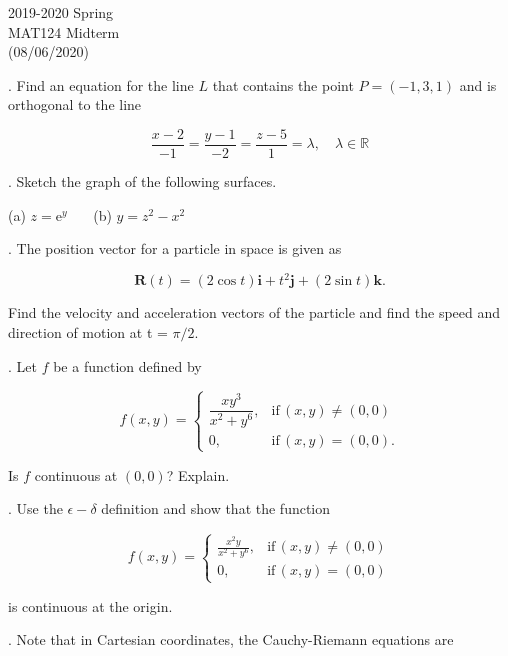 \documentclass{article}
\begin{document}
\pagestyle{empty}
\large

\begin{center}
2019-2020 Spring \\MAT124 Midterm\\(08/06/2020)
\end{center}

. Find an equation for the line $L$ that contains the point $P= (-1,3,1)$ and is orthogonal to the line

\[\frac{x-2}{-1}=\frac{y-1}{-2}=\frac{z-5}{1}=\lambda,\quad\lambda\in\mathbb{R}\]

\hfill

. Sketch the graph of the following surfaces.

\hfill

(a) $z=\mathrm e^y$ \ \ \ (b) $y=z^2-x^2$

\hfill

. The position vector for a particle in space is given as

\[\textbf{R}(t) = (2\cos t)\textbf{i}+t^2\textbf{j}+(2\sin t)\textbf{k}.\]
    
\noindent Find the velocity and acceleration vectors of the particle and find the speed and direction of motion at t = $\pi/2$.

\hfill

. Let $f$ be a function defined by

\[
f(x,y) =
\left.
\begin{cases}
\dfrac{xy^3}{x^2+y^6},&\text{if}\, (x, y)\neq (0,0)\\[1em]0,&\text{if}\,(x,y)=(0,0).
\end{cases}
\right.
\]

\hfill

\noindent Is $f$ continuous at $(0,0)$? Explain.

\hfill

. Use the $\epsilon - \delta$ definition and show that the function

\[
f(x,y) =
\left.
\begin{cases}
\displaystyle \frac{x^2y}{x^2+y^6},&\text{if}\, (x, y)\neq (0,0)\\[1em]0,&\text{if}\,(x,y)=(0,0)
\end{cases}
\right.
\]

\hfill

\noindent is continuous at the origin.

\hfill

. Note that in Cartesian coordinates, the Cauchy-Riemann equations are
\end{document}
